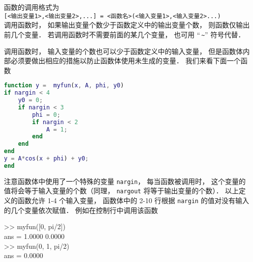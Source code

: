 函数的调用格式为\\
\texttt{[<输出变量1>,<输出变量2>,...] = <函数名>(<输入变量1>,<输入变量2>...)}\\
调用函数时， 如果输出变量个数少于函数定义中的输出变量个数， 则函数仅输出前几个变量． 若调用函数时不需要前面的某几个变量， 也可用 “\;\,\texttt{\~}” 符号代替．

调用函数时， 输入变量的个数也可以少于函数定义中的输入变量， 但是函数体内部必须要做出相应的措施以防止函数体使用未生成的变量． 我们来看下面一个函数
\begin{lstlisting}[language=Matlab]
function y =  myfun(x, A, phi, y0)
if nargin < 4
    y0 = 0;
    if nargin < 3
        phi = 0;
        if nargin < 2
            A = 1;
        end
    end
end
y = A*cos(x + phi) + y0;
end
\end{lstlisting}
注意函数体中使用了一个特殊的变量 \texttt{nargin}， 每当函数被调用时， 这个变量的值将会等于输入变量的个数（同理， \texttt{nargout} 将等于输出变量的个数）． 以上定义的函数允许 1-4 个输入变量， 函数体中的 2-10 行根据 \texttt{nargin} 的值对没有输入的几个变量依次赋值． 例如在控制行中调用该函数
\begin{Command}
>> myfun([0, pi/2])\\
ans = 1.0000    0.0000\\
>> myfun(0, 1, pi/2)\\
ans = 0.0000
\end{Command}










